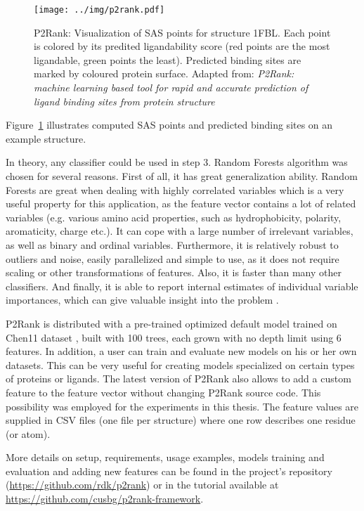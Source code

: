 \begin{figure}[!h]\centering
\texttt{[image: ../img/p2rank.pdf]}
\caption[P2Rank: Visualization of SAS points for structure 1FBL]{P2Rank: Visualization of SAS points for structure 1FBL. Each point is colored by its predited ligandability score (red points are the most ligandable, green points the least). Predicted binding sites are marked by coloured protein surface. Adapted from: \textit{P2Rank: machine learning based tool for rapid and accurate prediction of ligand binding sites from protein structure} \cite{p2rank1}}
\label{fig:p2rank}
\end{figure}

Figure~\ref{fig:p2rank} illustrates computed SAS points and predicted binding sites on an example structure.

In theory, any classifier could be used in step 3. Random Forests algorithm was chosen for several reasons. First of all, it has great generalization ability. Random Forests are great when dealing with highly correlated variables \cite{forests_biology} which is a very useful property for this application, as the feature vector contains a lot of related variables (e.g. various amino acid properties, such as hydrophobicity, polarity, aromaticity, charge etc.). It can cope with a large number of irrelevant variables, as well as binary and ordinal variables. Furthermore, it is relatively robust to outliers and noise, easily parallelized and simple to use, as it does not require scaling or other transformations of features. Also, it is faster than many other classifiers. And finally, it is able to report internal estimates of individual variable importances, which can give valuable insight into the problem \cite{randomforests, forests_biology, p2rank2}.

P2Rank is distributed with a pre-trained optimized default model trained on Chen11 dataset \cite{benchmark}, built with 100 trees, each grown with no depth limit using 6 features. In addition, a user can train and evaluate new models on his or her own datasets. This can be very useful for creating models specialized on certain types of proteins or ligands. The latest version of P2Rank also allows to add a custom feature to the feature vector without changing P2Rank source code. This possibility was employed for the experiments in this thesis. The feature values are supplied in CSV files (one file per structure) where one row describes one residue (or atom).

More details on setup, requirements, usage examples, models training and evaluation and adding new features can be found in the project's repository (\url{https://github.com/rdk/p2rank}) or in the tutorial available at \newline \url{https://github.com/cusbg/p2rank-framework}.


